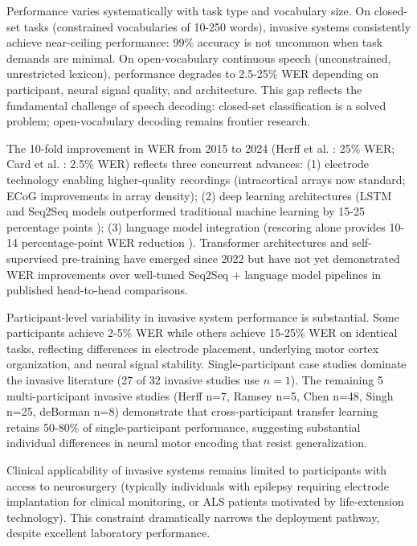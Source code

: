 Performance varies systematically with task type and vocabulary size. On closed-set tasks (constrained vocabularies of 10-250 words), invasive systems consistently achieve near-ceiling performance: 99\% accuracy is not uncommon when task demands are minimal. On open-vocabulary continuous speech (unconstrained, unrestricted lexicon), performance degrades to 2.5-25\% WER depending on participant, neural signal quality, and architecture. This gap reflects the fundamental challenge of speech decoding: closed-set classification is a solved problem; open-vocabulary decoding remains frontier research.

The 10-fold improvement in WER from 2015 to 2024 (Herff et al. \cite{Herff2015}: 25\% WER; Card et al. \cite{Card2024}: 2.5\% WER) reflects three concurrent advances: (1) electrode technology enabling higher-quality recordings (intracortical arrays now standard; ECoG improvements in array density); (2) deep learning architectures (LSTM and Seq2Seq models outperformed traditional machine learning by 15-25 percentage points \cite{ArchitectureComparison2020}); (3) language model integration (rescoring alone provides 10-14 percentage-point WER reduction \cite{Willett2023}). Transformer architectures and self-supervised pre-training have emerged since 2022 but have not yet demonstrated WER improvements over well-tuned Seq2Seq + language model pipelines in published head-to-head comparisons.

Participant-level variability in invasive system performance is substantial. Some participants achieve 2-5\% WER while others achieve 15-25\% WER on identical tasks, reflecting differences in electrode placement, underlying motor cortex organization, and neural signal stability. Single-participant case studies dominate the invasive literature (27 of 32 invasive studies use $n=1$). The remaining 5 multi-participant invasive studies (Herff n=7, Ramsey n=5, Chen n=48, Singh n=25, deBorman n=8) demonstrate that cross-participant transfer learning retains 50-80\% of single-participant performance, suggesting substantial individual differences in neural motor encoding that resist generalization.

Clinical applicability of invasive systems remains limited to participants with access to neurosurgery (typically individuals with epilepsy requiring electrode implantation for clinical monitoring, or ALS patients motivated by life-extension technology). This constraint dramatically narrows the deployment pathway, despite excellent laboratory performance.

